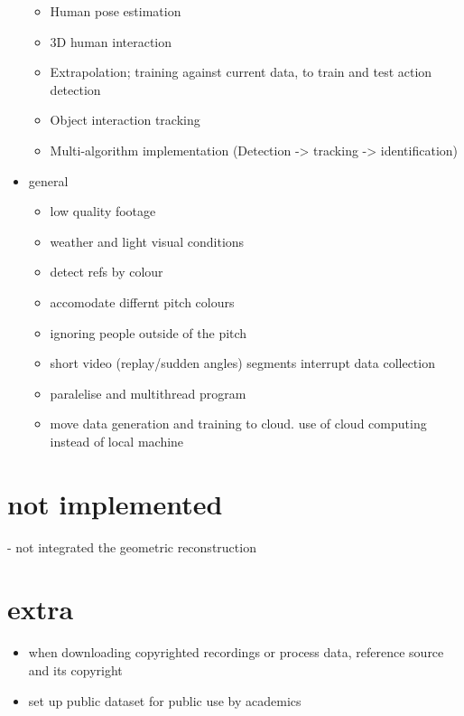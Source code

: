 \documentclass[
11pt,
twoside
]{report}
\begin{document}
\begin{itemize}
  \begin{itemize}
  \item
    Human pose estimation
  \item
    3D human interaction
  \item
    Extrapolation; training against current data, to train and test action detection
  \item
    Object interaction tracking
  \item
    Multi-algorithm implementation (Detection -\textgreater{} tracking
    -\textgreater{} identification)
  \end{itemize}
\item
  general

  \begin{itemize}
  \item
    low quality footage
  \item
    weather and light visual conditions
  \item
    detect refs by colour
  \item
    accomodate differnt pitch colours
  \item
    ignoring people outside of the pitch
  \item
    short video (replay/sudden angles) segments interrupt data
    collection
    \item
     paralelise and multithread program
    \item
     move data generation and training to cloud.
    use of cloud computing instead of local machine
  \end{itemize}
\end{itemize}


\section{not implemented}

- not integrated the geometric reconstruction


\section{extra}

\begin{itemize}
\item
  when downloading copyrighted recordings or process data, reference
  source and its copyright
\item
  set up public dataset for public use by academics
\end{itemize}


\printbibliography
\end{document}
